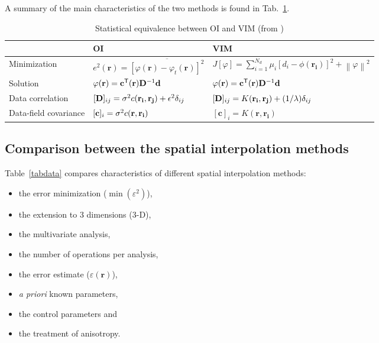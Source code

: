 A summary of the main characteristics of the two methods is found in Tab.~\ref{tabOAVIM}.


\begin{table}[htpb]
\caption{Statistical equivalence between OI and VIM (from \citet{RIXEN00})\label{tabOAVIM}}
\begin{tabular*}{0.99\textwidth}{@{\extracolsep{\fill}}lll}
\toprule
											&		OI	& VIM \\
\midrule
Minimization \rule{0pt}{3ex}	& $e^{2}(\mathbf{r})= \overline{ [\varphi(\mathbf{r})-\varphi_{t}(\mathbf{r})]^{2}}$ 	& $J[\varphi]=\sum_{i=1}^{N_d}\mu_{i}[d_{i}-\phi(\mathbf{r_{i}})]^{2}+\left\|\varphi\right\|^{2}$							\\
Solution						& $\varphi(\mathbf{r})= {\mathbf{c}}^\mathsf{T}(\mathbf{r})\mathbf{D}^{-1}\mathbf{d}$			& 
$\varphi(\mathbf{r})= {\mathbf{c}}^\mathsf{T}(\mathbf{r})\mathbf{D}^{-1}\mathbf{d}$												\\
Data correlation				& $[\mathbf{D}]_{ij}=\sigma^{2} c(\mathbf{r_{i}},\mathbf{r_{j}})+\epsilon^{2}\delta_{ij}$& $[\mathbf{D}]_{ij}=K(\mathbf{r_i},\mathbf{r_j})+(1/\lambda)\delta_{ij}$														\\
Data-field covariance 			& $[\mathbf{c}]_{i}=\sigma^{2} c(\mathbf{r},\mathbf{r_{i}})$							& $[\mathbf{c}]_{i}=K(\mathbf{r},\mathbf{r_{i}})$																			\\
\bottomrule
\end{tabular*}
\end{table}

\subsection{Comparison between the spatial interpolation methods}

Table~\ref{tabdata} compares characteristics of different spatial interpolation methods: 
\begin{itemize}
\item the error minimization ($\min( \varepsilon^2)$),
\item the extension to 3 dimensions (3-D), 
\item the multivariate analysis, 
\item the number of operations per analysis, 
\item the error estimate ($\varepsilon(\mathbf{r})$),
\item \textit{a priori} known parameters, 
\item the control parameters and 
\item the treatment of anisotropy. 
\end{itemize} 

